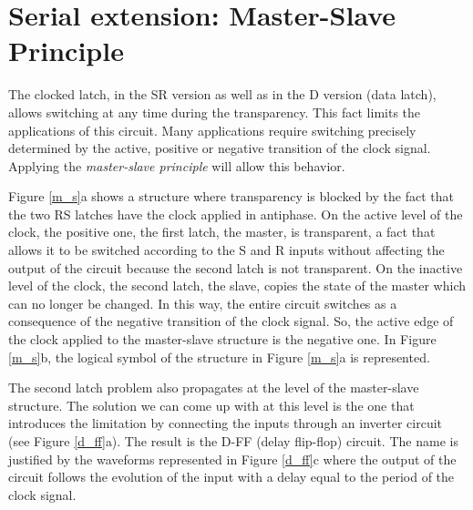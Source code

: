 \section{Serial extension: Master-Slave Principle}

The clocked latch, in the SR version as well as in the D version (data latch), allows switching at any time during the transparency. This fact limits the applications of this circuit. Many applications require switching precisely determined by the active, positive or negative transition of the clock signal. Applying the {\em master-slave principle} will allow this behavior.

Figure \ref{m_s}a shows a structure where transparency is blocked by the fact that the two RS latches have the clock applied in antiphase. On the active level of the clock, the positive one, the first latch, the master, is transparent, a fact that allows it to be switched according to the S and R inputs without affecting the output of the circuit because the second latch is not transparent. On the inactive level of the clock, the second latch, the slave, copies the state of the master which can no longer be changed. In this way, the entire circuit switches as a consequence of the negative transition of the clock signal. So, the active edge of the clock applied to the master-slave structure is the negative one. In Figure \ref{m_s}b, the logical symbol of the structure in Figure \ref{m_s}a is represented.




The second latch problem also propagates at the level of the master-slave structure. The solution we can come up with at this level is the one that introduces the limitation by connecting the inputs through an inverter circuit (see Figure \ref{d_ff}a). The result is the D-FF (delay flip-flop) circuit. The name is justified by the waveforms represented in Figure \ref{d_ff}c where the output of the circuit follows the evolution of the input with a delay equal to the period of the clock signal.

